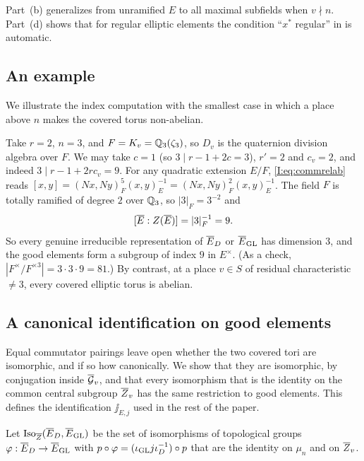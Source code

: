 \begin{remark}
Part~(b) generalizes \cite[Lemma~2.5]{JC26a} from unramified $E$ to all maximal subfields when $v\nmid n$. Part~(d) shows that for regular elliptic elements the condition ``$x^*$ regular'' in \cite[\S18]{FK86} is automatic.
\end{remark}

\subsection{An example}\label{I:subsec:example}
We illustrate the index computation with the smallest case in which a place above $n$ makes the covered torus non-abelian.

\begin{example}\label{I:ex:r2n3}
Take $r=2$, $n=3$, and $F=K_v=\mathbb{Q}_3(\zeta_3)$, so $D_v$ is the quaternion division algebra over $F$. We may take $c=1$ (so $3\mid r-1+2c=3$), $r'=2$ and $c_v=2$, and indeed $3\mid r-1+2rc_v=9$. For any quadratic extension $E/F$, \eqref{I:eq:commrelab} reads $[x,y]=(Nx,Ny)_F^{5}(x,y)_E^{-1}=(Nx,Ny)_F^{2}(x,y)_E^{-1}$. The field $F$ is totally ramified of degree $2$ over $\mathbb{Q}_3$, so $|3|_F=3^{-2}$ and
\[ [\overline{E}:Z(\overline{E})]=|3|_F^{-1}=9. \]
So every genuine irreducible representation of $\overline{E}_D$ or $\overline{E}_{\mathrm{GL}}$ has dimension $3$, and the good elements form a subgroup of index $9$ in $E^\times$. (As a check, $|F^\times/F^{\times3}|=3\cdot3\cdot9=81$.) By contrast, at a place $v\in S$ of residual characteristic $\ne3$, every covered elliptic torus is abelian.
\end{example}

\subsection{A canonical identification on good elements}\label{I:subsec:ident}
Equal commutator pairings leave open whether the two covered tori are isomorphic, and if so how canonically. We show that they are isomorphic, by conjugation inside $\overline{\mathcal{G}}_v$, and that every isomorphism that is the identity on the common central subgroup $\overline{Z}_v$ has the same restriction to good elements. This defines the identification $\jj_{E,j}$ used in the rest of the paper.

\begin{definition}
Let $\operatorname{Iso}_{\overline{Z}}(\overline{E}_D,\overline{E}_{\mathrm{GL}})$ be the set of isomorphisms of topological groups $\varphi:\overline{E}_D\to\overline{E}_{\mathrm{GL}}$ with $p\circ\varphi=(\iota_{\mathrm{GL}} j\iota_D^{-1})\circ p$ that are the identity on $\mu_n$ and on $\overline{Z}_v$.
\end{definition}


